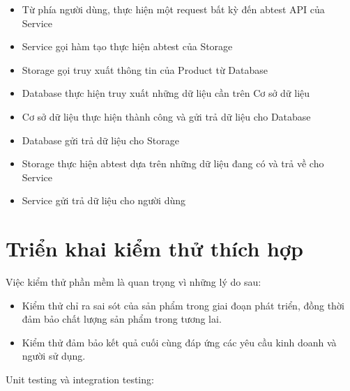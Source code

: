 \begin{itemize}
	\item Từ phía người dùng, thực hiện một request bất kỳ đến abtest API của Service
	\item Service gọi hàm tạo thực hiện abtest của Storage
	\item Storage gọi truy xuất thông tin của Product từ Database
	\item Database thực hiện truy xuất những dữ liệu cần trên Cơ sở dữ liệu
	\item Cơ sở dữ liệu thực hiện thành công và gửi trả dữ liệu cho Database
	\item Database gửi trả dữ liệu cho Storage
	\item Storage thực hiện abtest dựa trên những dữ liệu đang có và trả về cho Service
	\item Service gửi trả dữ liệu cho người dùng
\end{itemize}

\section{Triển khai kiểm thử thích hợp}

Việc kiểm thử phần mềm là quan trọng vì những lý do sau:

\begin{itemize}
	\item Kiểm thử chỉ ra sai sót của sản phẩm trong giai đoạn phát triển, đồng thời đảm bảo chất lượng sản phẩm trong tương lai.
	\item Kiểm thử đảm bảo kết quả cuối cùng đáp ứng các yêu cầu kinh doanh và người sử dụng.
\end{itemize}

Unit testing và integration testing:

